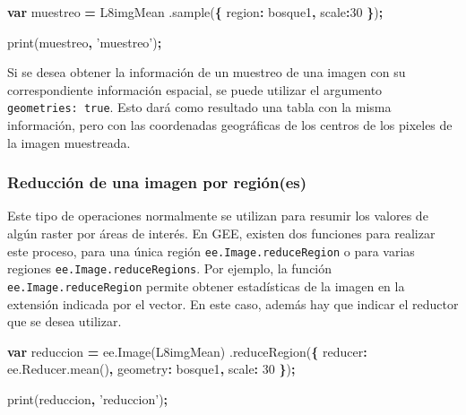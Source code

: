 \documentclass[
]{article}
\newenvironment{Shaded}{\begin{snugshade}}{\end{snugshade}}
\newcommand{\AttributeTok}[1]{\textcolor[rgb]{0.77,0.63,0.00}{#1}}
\newcommand{\DataTypeTok}[1]{\textcolor[rgb]{0.13,0.29,0.53}{#1}}
\newcommand{\DecValTok}[1]{\textcolor[rgb]{0.00,0.00,0.81}{#1}}
\newcommand{\KeywordTok}[1]{\textcolor[rgb]{0.13,0.29,0.53}{\textbf{#1}}}
\newcommand{\NormalTok}[1]{#1}
\newcommand{\OperatorTok}[1]{\textcolor[rgb]{0.81,0.36,0.00}{\textbf{#1}}}
\newcommand{\StringTok}[1]{\textcolor[rgb]{0.31,0.60,0.02}{#1}}
\newcommand{\VariableTok}[1]{\textcolor[rgb]{0.00,0.00,0.00}{#1}}
\begin{document}
\begin{Shaded}
\begin{Highlighting}[]
\KeywordTok{var}\NormalTok{ muestreo }\OperatorTok{=}\NormalTok{ L8imgMean}
\NormalTok{  .}\AttributeTok{sample}\NormalTok{(}\OperatorTok{\{}
    \DataTypeTok{region}\OperatorTok{:}\NormalTok{ bosque1}\OperatorTok{,}
    \DataTypeTok{scale}\OperatorTok{:}\DecValTok{30}
  \OperatorTok{\}}\NormalTok{)}\OperatorTok{;}

\AttributeTok{print}\NormalTok{(muestreo}\OperatorTok{,} \StringTok{'muestreo'}\NormalTok{)}\OperatorTok{;}
\end{Highlighting}
\end{Shaded}

\begin{tipblock}
Si se desea obtener la información de un muestreo de una imagen con su
correspondiente información espacial, se puede utilizar el argumento
\texttt{geometries:\ true}. Esto dará como resultado una tabla con la
misma información, pero con las coordenadas geográficas de los centros
de los pixeles de la imagen muestreada.

\end{tipblock}

\hypertarget{reducciuxf3n-de-una-imagen-por-regiuxf3nes}{%
\subsubsection{Reducción de una imagen por
región(es)}\label{reducciuxf3n-de-una-imagen-por-regiuxf3nes}}

Este tipo de operaciones normalmente se utilizan para resumir los
valores de algún raster por áreas de interés. En GEE, existen dos
funciones para realizar este proceso, para una única región
\texttt{ee.Image.reduceRegion} o para varias regiones
\texttt{ee.Image.reduceRegions}. Por ejemplo, la función
\texttt{ee.Image.reduceRegion} permite obtener estadísticas de la imagen
en la extensión indicada por el vector. En este caso, además hay que
indicar el reductor que se desea utilizar.

\begin{Shaded}
\begin{Highlighting}[]
\KeywordTok{var}\NormalTok{ reduccion }\OperatorTok{=} \VariableTok{ee}\NormalTok{.}\AttributeTok{Image}\NormalTok{(L8imgMean)}
\NormalTok{  .}\AttributeTok{reduceRegion}\NormalTok{(}\OperatorTok{\{}
    \DataTypeTok{reducer}\OperatorTok{:} \VariableTok{ee}\NormalTok{.}\VariableTok{Reducer}\NormalTok{.}\AttributeTok{mean}\NormalTok{()}\OperatorTok{,}
    \DataTypeTok{geometry}\OperatorTok{:}\NormalTok{ bosque1}\OperatorTok{,}
    \DataTypeTok{scale}\OperatorTok{:} \DecValTok{30}
  \OperatorTok{\}}\NormalTok{)}\OperatorTok{;}
  
\AttributeTok{print}\NormalTok{(reduccion}\OperatorTok{,} \StringTok{'reduccion'}\NormalTok{)}\OperatorTok{;}
\end{Highlighting}
\end{Shaded}
\end{document}
